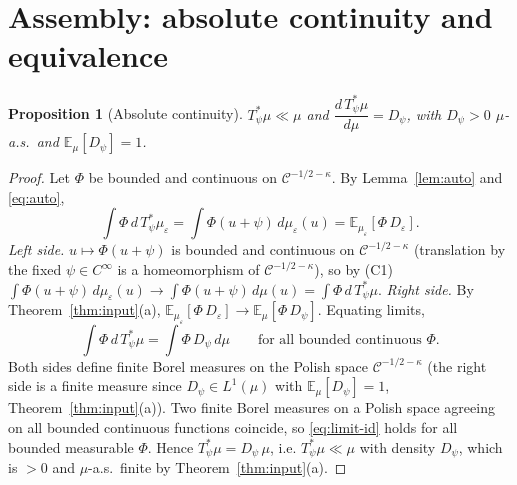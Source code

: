 \documentclass[12pt]{article}
\newcommand{\bE}{\mathbb{E}}
\newcommand{\eps}{\varepsilon}
\newcommand{\kp}{\kappa}
\theoremstyle{plain}
\newtheorem{proposition}{Proposition}
\theoremstyle{definition}
\begin{document}
\section{Assembly: absolute continuity and equivalence}\label{sec:assembly}

\begin{proposition}[Absolute continuity]\label{prop:ac}
$T_\psi^\ast\mu\ll\mu$ and $\dfrac{d\,T_\psi^\ast\mu}{d\mu}=D_\psi$, with $D_\psi>0$
$\mu$-a.s.\ and $\bE_\mu[D_\psi]=1$.
\end{proposition}

\begin{proof}
Let $\Phi$ be bounded and continuous on $\mathcal{C}^{-1/2-\kp}$. By
Lemma~\ref{lem:auto} and \eqref{eq:auto},
\begin{equation}\label{eq:eps-id}
\int\Phi\,d\,T_\psi^\ast\mu_\eps=\int\Phi(u+\psi)\,d\mu_\eps(u)=\bE_{\mu_\eps}[\Phi\,D_\eps].
\end{equation}
\emph{Left side.} $u\mapsto\Phi(u+\psi)$ is bounded and continuous on
$\mathcal{C}^{-1/2-\kp}$ (translation by the fixed $\psi\in C^\infty$ is a homeomorphism
of $\mathcal{C}^{-1/2-\kp}$), so by (C1)
$\int\Phi(u+\psi)\,d\mu_\eps(u)\to\int\Phi(u+\psi)\,d\mu(u)=\int\Phi\,d\,T_\psi^\ast\mu$.
\emph{Right side.} By Theorem~\ref{thm:input}(a), $\bE_{\mu_\eps}[\Phi\,D_\eps]\to
\bE_\mu[\Phi\,D_\psi]$. Equating limits,
\begin{equation}\label{eq:limit-id}
\int\Phi\,d\,T_\psi^\ast\mu=\int\Phi\,D_\psi\,d\mu
\qquad\text{for all bounded continuous }\Phi.
\end{equation}
Both sides define finite Borel measures on the Polish space $\mathcal{C}^{-1/2-\kp}$
(the right side is a finite measure since $D_\psi\in L^1(\mu)$ with $\bE_\mu[D_\psi]=1$,
Theorem~\ref{thm:input}(a)). Two finite Borel measures on a Polish space agreeing on all
bounded continuous functions coincide, so \eqref{eq:limit-id} holds for all bounded
measurable $\Phi$. Hence $T_\psi^\ast\mu=D_\psi\,\mu$, i.e. $T_\psi^\ast\mu\ll\mu$ with
density $D_\psi$, which is $>0$ and $\mu$-a.s.\ finite by Theorem~\ref{thm:input}(a).
\end{proof}
\end{document}
